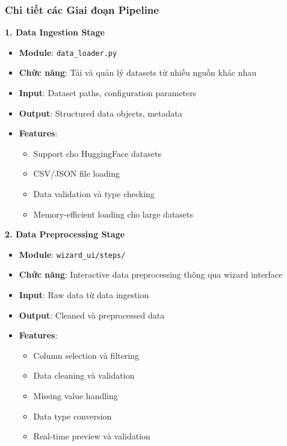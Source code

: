 \subsubsection{Chi tiết các Giai đoạn Pipeline}

\textbf{1. Data Ingestion Stage}
\begin{itemize}
    \item \textbf{Module}: \texttt{data\_loader.py}
    \item \textbf{Chức năng}: Tải và quản lý datasets từ nhiều nguồn khác nhau
    \item \textbf{Input}: Dataset paths, configuration parameters
    \item \textbf{Output}: Structured data objects, metadata
    \item \textbf{Features}: 
        \begin{itemize}
            \item Support cho HuggingFace datasets
            \item CSV/JSON file loading
            \item Data validation và type checking
            \item Memory-efficient loading cho large datasets
        \end{itemize}
\end{itemize}

\textbf{2. Data Preprocessing Stage}
\begin{itemize}
    \item \textbf{Module}: \texttt{wizard\_ui/steps/}
    \item \textbf{Chức năng}: Interactive data preprocessing thông qua wizard interface
    \item \textbf{Input}: Raw data từ data ingestion
    \item \textbf{Output}: Cleaned và preprocessed data
    \item \textbf{Features}:
        \begin{itemize}
            \item Column selection và filtering
            \item Data cleaning và validation
            \item Missing value handling
            \item Data type conversion
            \item Real-time preview và validation
        \end{itemize}
\end{itemize}

